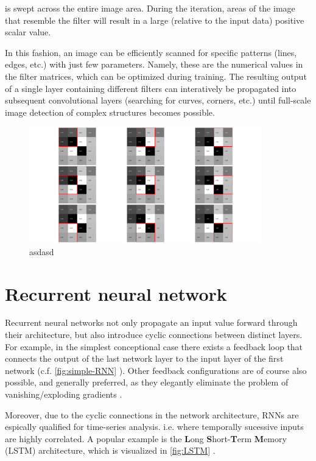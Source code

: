 is swept across the entire image area. During the iteration, areas of the image that resemble the filter will result in a large (relative to the input data)
positive scalar value.

In this fashion, an image can be efficiently scanned for specific patterns (lines, edges, etc.) with just few parameters. Namely, these are the numerical
values in the filter matrices, which can be optimized during training. The resulting output of a single layer containing different filters can interatively 
be propagated into subsequent convolutional layers (searching for curves, corners, etc.) until full-scale image detection of complex structures becomes possible.

\begin{figure}
	\centering
	\includegraphics[width=0.9\textwidth]{imgs/convolution.png}
	\caption{asdasd \label{fig:convolution}}
\end{figure}

\section{Recurrent neural network}
\label{sec:RNN}

Recurrent neural networks not only propagate an input value forward through their architecture, but also introduce cyclic connections between distinct layers. For
example, in the simplest conceptional case there exists a feedback loop that connects the output of the last network layer to the input layer of the first network
(c.f. \autoref{fig:simple-RNN} \TODO). Other feedback configurations are of course also possible, and generally preferred, as they elegantly eliminate the problem
of vanishing/exploding gradients \cite{hochreiter1991untersuchungen}. 

Moreover, due to the cyclic connections in the network architecture, RNNs are espically qualified for time-series analysis. i.e. where temporally sucessive inputs
are highly correlated. A popular example is the \textbf{L}ong \textbf{S}hort-\textbf{T}erm \textbf{M}emory (LSTM) architecture, which is visualized in 
\autoref{fig:LSTM} \TODO.

